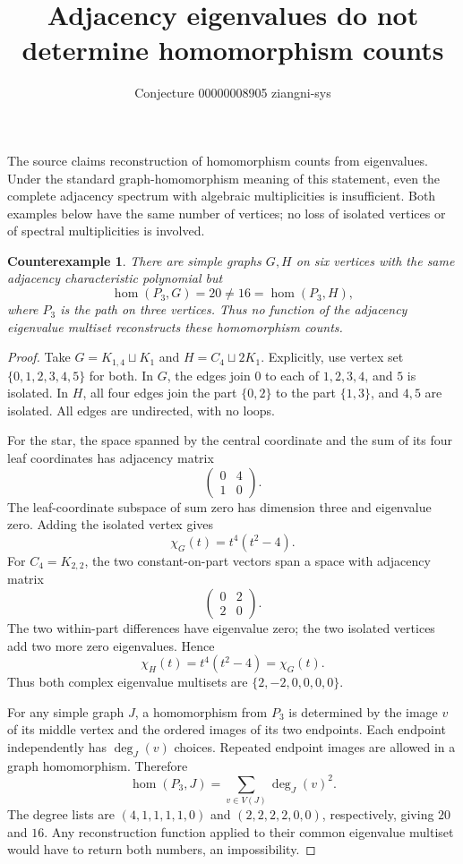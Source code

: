 \documentclass[11pt]{article}
\title{Adjacency eigenvalues do not determine homomorphism counts}
\author{Conjecture 00000008905 \quad ziangni-sys}
\date{}
\newtheorem*{proposition}{Counterexample}
\begin{document}
\maketitle
The source claims reconstruction of homomorphism counts from eigenvalues. Under the standard graph-homomorphism meaning of this statement, even the complete adjacency spectrum with algebraic multiplicities is insufficient. Both examples below have the same number of vertices; no loss of isolated vertices or of spectral multiplicities is involved.

\begin{proposition}
There are simple graphs $G,H$ on six vertices with the same adjacency characteristic polynomial but
\[
 \operatorname{hom}(P_3,G)=20\ne16=\operatorname{hom}(P_3,H),
\]
where $P_3$ is the path on three vertices. Thus no function of the adjacency eigenvalue multiset reconstructs these homomorphism counts.
\end{proposition}
\begin{proof}
Take $G=K_{1,4}\sqcup K_1$ and $H=C_4\sqcup2K_1$. Explicitly, use vertex set $\{0,1,2,3,4,5\}$ for both. In $G$, the edges join $0$ to each of $1,2,3,4$, and $5$ is isolated. In $H$, all four edges join the part $\{0,2\}$ to the part $\{1,3\}$, and $4,5$ are isolated. All edges are undirected, with no loops.

For the star, the space spanned by the central coordinate and the sum of its four leaf coordinates has adjacency matrix
\[
 \begin{pmatrix}0&4\\1&0\end{pmatrix}.
\]
The leaf-coordinate subspace of sum zero has dimension three and eigenvalue zero. Adding the isolated vertex gives
\[
 \chi_G(t)=t^4(t^2-4).
\]
For $C_4=K_{2,2}$, the two constant-on-part vectors span a space with adjacency matrix
\[
 \begin{pmatrix}0&2\\2&0\end{pmatrix}.
\]
The two within-part differences have eigenvalue zero; the two isolated vertices add two more zero eigenvalues. Hence
\[
 \chi_H(t)=t^4(t^2-4)=\chi_G(t).
\]
Thus both complex eigenvalue multisets are $\{2,-2,0,0,0,0\}$.

For any simple graph $J$, a homomorphism from $P_3$ is determined by the image $v$ of its middle vertex and the ordered images of its two endpoints. Each endpoint independently has $\deg_J(v)$ choices. Repeated endpoint images are allowed in a graph homomorphism. Therefore
\[
 \operatorname{hom}(P_3,J)=\sum_{v\in V(J)}\deg_J(v)^2.
\]
The degree lists are $(4,1,1,1,1,0)$ and $(2,2,2,2,0,0)$, respectively, giving $20$ and $16$. Any reconstruction function applied to their common eigenvalue multiset would have to return both numbers, an impossibility.
\end{proof}
\end{document}
